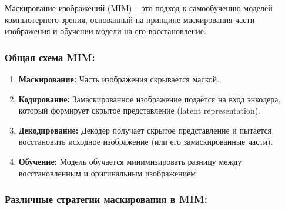 Маскирование изображений (MIM) – это подход к самообучению моделей компьютерного зрения, основанный на принципе маскирования части изображения и обучении модели на его восстановление. 

\subsubsection{Общая схема MIM:}

\begin{enumerate}
    \item \textbf{Маскирование:} Часть изображения скрывается маской.
    \item \textbf{Кодирование:} Замаскированное изображение подаётся на вход энкодера, который формирует скрытое представление (latent representation).
    \item \textbf{Декодирование:} Декодер получает скрытое представление и пытается восстановить исходное изображение (или его замаскированные части).
    \item \textbf{Обучение:} Модель обучается минимизировать разницу между восстановленным и оригинальным изображением.
\end{enumerate}

\subsubsection{Различные стратегии маскирования в MIM:}

